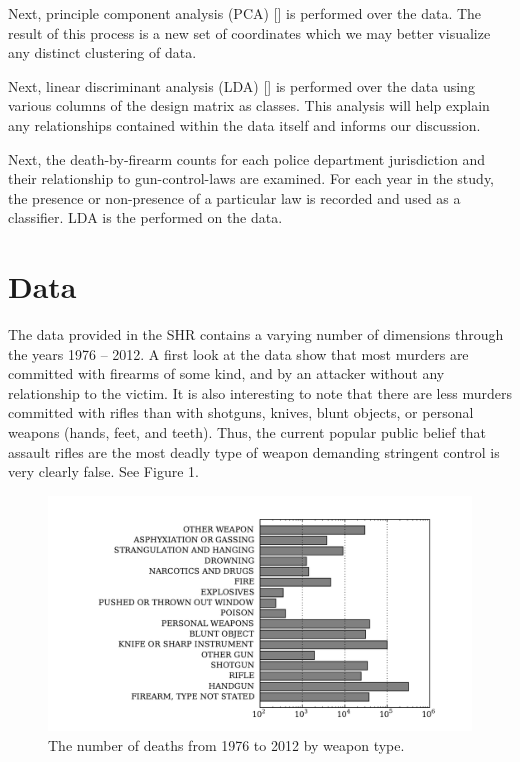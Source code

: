 \begin{multicols}{2}
Next, principle component analysis (PCA) [\cite{sergios}] is performed over the data.  The result of this process is a new set of coordinates which we may better visualize any distinct clustering of data.

Next, linear discriminant analysis (LDA) [\cite{sergios}] is performed over the data using various columns of the design matrix as classes.  This analysis will help explain any relationships contained within the data itself and informs our discussion.

Next, the death-by-firearm counts for each police department jurisdiction and their relationship to gun-control-laws are examined.  For each year in the study, the presence or non-presence of a particular law is recorded and used as a classifier.  LDA is the performed on the data.

\section{Data}

The data provided in the SHR contains a varying number of dimensions through the years 1976 -- 2012.  A first look at the data show that most murders are committed with firearms of some kind, and by an attacker without any relationship to the victim.  It is also interesting to note that there are less murders committed with rifles than with shotguns, knives, blunt objects, or personal weapons (hands, feet, and teeth).  Thus, the current popular public belief that assault rifles are the most deadly type of weapon demanding stringent control is very clearly false.  See Figure 1.

\begin{figure}[H]
  \centering
    \includegraphics[width=1.0\linewidth]{images/weaps.pdf}
  \caption{The number of deaths from 1976 to 2012 by weapon type.}
\end{figure}


\end{multicols}
